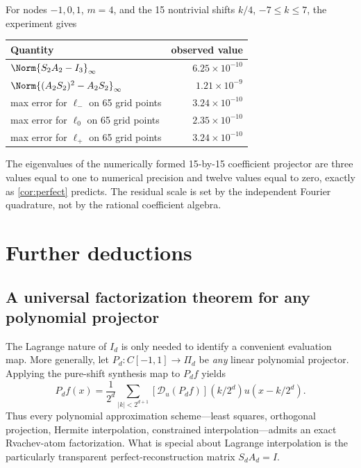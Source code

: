 \documentclass[11pt,oneside]{article}
\numberwithin{equation}{section}
\theoremstyle{definition}
\theoremstyle{remark}
\newcommand{\calD}{\mathscr D_u}
\begin{document}
For nodes \(-1,0,1\), \(m=4\), and the 15 nontrivial shifts
\(k/4\), \(-7\le k\le7\), the experiment gives
\begin{center}
\begin{tabular}{@{}lr@{}}
\toprule
Quantity & observed value\\
\midrule
\(\Norm{S_2A_2-I_3}_\infty\) & \(6.25\times10^{-10}\)\\
\(\Norm{(A_2S_2)^2-A_2S_2}_\infty\) & \(1.21\times10^{-9}\)\\
max error for \(\ell_-\) on 65 grid points & \(3.24\times10^{-10}\)\\
max error for \(\ell_0\) on 65 grid points & \(2.35\times10^{-10}\)\\
max error for \(\ell_+\) on 65 grid points & \(3.24\times10^{-10}\)\\
\bottomrule
\end{tabular}
\end{center}
The eigenvalues of the numerically formed 15-by-15 coefficient projector are three
values equal to one to numerical precision and twelve values equal to zero, exactly
as \cref{cor:perfect} predicts.  The residual scale is set by the independent
Fourier quadrature, not by the rational coefficient algebra.

\section{Further deductions}
\label{sec:deductions}

\subsection{A universal factorization theorem for any polynomial projector}
The Lagrange nature of \(I_d\) is only needed to identify a convenient evaluation
map.  More generally, let \(P_d:C[-1,1]\to\Pi_d\) be \emph{any} linear polynomial
projector.  Applying the pure-shift synthesis map to \(P_df\) yields
\begin{equation}
 P_df(x)=\frac1{2^d}\sum_{|k|<2^{d+1}}
 [\calD(P_df)](k/2^d)u(x-k/2^d).
 \label{eq:any-projector}
\end{equation}
Thus every polynomial approximation scheme---least squares, orthogonal
projection, Hermite interpolation, constrained interpolation---admits an exact
Rvachev-atom factorization.  What is special about Lagrange interpolation is the
particularly transparent perfect-reconstruction matrix \(S_dA_d=I\).
\end{document}

